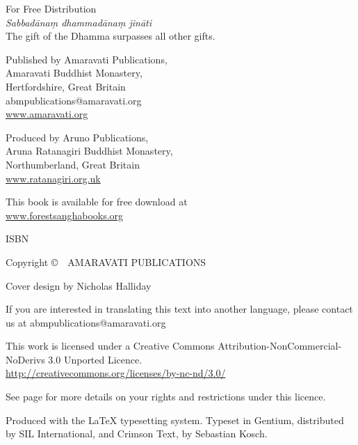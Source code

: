 {\small\setlength{\parskip}{0.8em}\setlength{\parindent}{0em}%
{\raggedright%

\thetitle

For Free Distribution\\
\emph{Sabbadānaṃ dhammadānaṃ jināti}\\
The gift of the Dhamma surpasses all other gifts.

Published by Amaravati Publications,\\
Amaravati Buddhist Monastery,\\
Hertfordshire, Great Britain\\
abmpublications@amaravati.org\\
\href{http://amaravati.org}{www.amaravati.org}

Produced by Aruno Publications,\\
Aruna Ratanagiri Buddhist Monastery,\\
Northumberland, Great Britain\\
\href{http://ratanagiri.org.uk/}{www.ratanagiri.org.uk}

This book is available for free download at\\
\href{http://forestsanghabooks.org/}{www.forestsanghabooks.org}

ISBN \theISBN

Copyright \copyright\ \the\year\ AMARAVATI PUBLICATIONS

Cover design by Nicholas Halliday

\vfill

{\footnotesize
If you are interested in translating this text into another language, please contact us at abmpublications@amaravati.org

This work is licensed under a Creative Commons Attribution-NonCommercial-NoDerivs 3.0 Unported Licence.\\
\href{http://creativecommons.org/licenses/by-nc-nd/3.0/}{http://creativecommons.org/licenses/by-nc-nd/3.0/}

See page \pageref{copyright-details} for more details on your rights and restrictions under this licence.

Produced with the {\selectfont\LaTeX} typesetting system. Typeset in Gentium, distributed by SIL International, and Crimson Text, by Sebastian Kosch.

\theEditionInfo

}

}}

